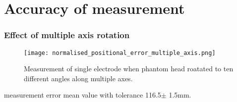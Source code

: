 \section{Accuracy of measurement}
\begin{frame}
	\frametitle{Effect of multiple axis rotation}
	\begin{figure}[hbt!]
		\centering
		\texttt{[image: normalised\_positional\_error\_multiple\_axis.png]}
		\caption{Measurement of single electrode when phantom head roatated to ten different angles along multiple axes.}  
		\label{fig:Normalised_positional_error_multiple_axis}
	\end{figure}
	
\begin{block}{measurement error}
	mean value with tolerance  116.5$\pm$ 1.5mm.
\end{block}
		
\end{frame}


